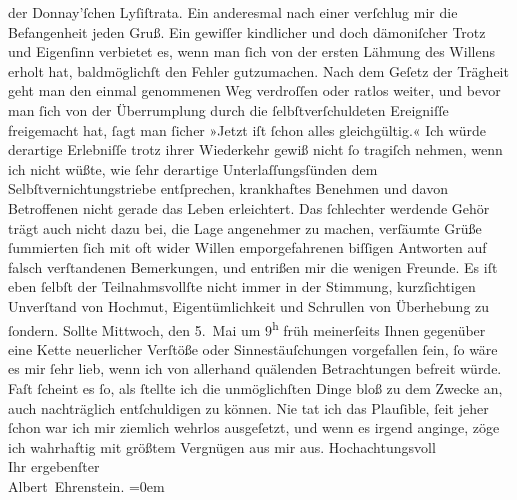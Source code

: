 \begin{ledgroupsized}[t]{13cm}
               der Donnay’ſchen {\pb}Lyſiſtrata. Ein anderesmal nach einer \label{K_L01840-2v}\label{K_L01840-2h} verſchlug mir die Befangenheit jeden
               Gruß. Ein gewiſſer kindlicher und doch dämoniſcher Trotz und Eigenſinn verbietet es,
               wenn man ſich von der ersten Lähmung des Willens erholt hat, baldmöglichſt den Fehler
               gutzumachen. Nach dem Geſetz der Trägheit geht man den einmal genommenen Weg
               verdroſſen oder ratlos weiter, und bevor man ſich von der Überrumplung durch die
               ſelbſtverſchuldeten Ereigniſſe freigemacht hat, ſagt man ſicher »Jetzt iſt ſchon
               alles gleichgültig.« Ich würde derartige Erlebniſſe trotz ihrer Wiederkehr gewiß
               nicht ſo tragiſch nehmen, wenn ich nicht wüßte, wie ſehr derartige
               Unterlaſſungsſünden dem Selbſtvernichtungstriebe entſprechen, krankhaftes Benehmen
               und davon Betroffenen nicht gerade das Leben erleichtert. Das ſchlechter werdende
               Gehör trägt auch nicht dazu bei, {\pb}die Lage
               angenehmer zu machen, verſäumte Grüße ſummierten ſich mit oft wider Willen
               emporgefahrenen biſſigen Antworten auf falsch verſtandenen Bemerkungen, und entrißen
               mir die wenigen Freunde. Es iſt eben ſelbſt der Teilnahmsvollſte nicht immer in der
               Stimmung, kurzſichtigen Unverſtand von Hochmut, Eigentümlichkeit und Schrullen von
               Überhebung zu ſondern. Sollte Mittwoch, den 5. Mai um 9\textsuperscript{h} früh meinerſeits Ihnen gegenüber eine Kette
               neuerlicher Verſtöße oder Sinnestäuſchungen vorgefallen ſein, ſo wäre es mir ſehr
               lieb, wenn ich von allerhand quälenden Betrachtungen befreit würde. Faſt ſcheint es
               ſo, als ſtellte ich die unmöglichſten Dinge bloß zu dem Zwecke an, auch nachträglich
               entſchuldigen zu können. Nie tat ich das Plauſible, ſeit jeher ſchon war ich mir
               ziemlich wehrlos ausgeſetzt, und wenn es irgend anginge, zöge ich {\pb}wahrhaftig mit größtem Vergnügen aus mir
               aus.\pend
           \pstart
           Hochachtungsvoll{\\[\baselineskip]}Ihr ergebenſter{\\[\baselineskip]}\spacefill\mbox{Albert Ehrenstein.}\pend
           \leftskip=0em{}
         

\end{ledgroupsized}
